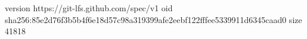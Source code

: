 version https://git-lfs.github.com/spec/v1
oid sha256:85e2d76f3b5b4f6e18d57c98a319399afe2eebf122fffee5339911d6345caad0
size 41818
